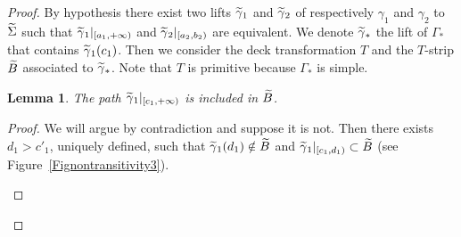 \documentclass[10pt,a4paper]{article}
\newtheorem{lemm}[prop]{Lemma}
\theoremstyle{definition}
\theoremstyle{plain}
\numberwithin{equation}{section}
\numberwithin{figure}{section}
\let\oldtilde\tilde
\renewcommand*{\tilde}[1]{\mathchoice{\widetilde{#1}}{\widetilde{#1}}{\oldtilde{#1}}{\oldtilde{#1}}}
\begin{document}
\begin{proof}
By hypothesis there exist two lifts $\tilde\gamma_1$ and $\tilde\gamma_2$ of respectively $\gamma_1$ and $\gamma_2$ to $\tilde\Sigma$ such that $\tilde\gamma_1|_{[a_1, +\infty)}$ and $\tilde\gamma_2|_{[a_2, b_2)}$ are equivalent. We denote $\tilde \gamma_*$ the lift of $\Gamma_*$ that contains $\tilde\gamma_1(c_1)$. Then we consider the deck transformation $T$ and the $T$-strip $\tilde B$ associated to $\tilde\gamma_*$. Note that $T$ is primitive because $\Gamma_*$ is simple.

\begin{lemm}\label{LemInclus}
The path $\tilde\gamma_1|_{[c_1,+\infty)}$ is included in $\tilde B$.
\end{lemm}

\begin{proof}
We will argue by contradiction and suppose it is not. Then there exists $d_1>c'_1$, uniquely defined, such that $\tilde\gamma_1(d_1)\notin\tilde B$ and $\tilde\gamma_1\vert_{[c_1,d_1)}\subset\tilde B$ (see Figure~\ref{Fignontransitivity3}).

\begin{figure}
\begin{center}

\end{center}
\end{figure}
\end{proof}
\end{proof}
\end{document}
